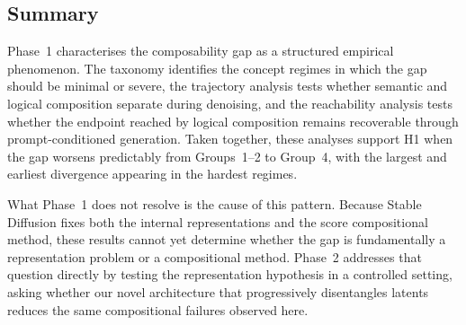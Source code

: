 \subsection{Summary}
\label{subsec:p1_predictions}

Phase~1 characterises the composability gap as a structured empirical phenomenon. The taxonomy
identifies the concept regimes in which the gap should be minimal or severe, the trajectory analysis
tests whether semantic and logical composition separate during denoising, and the reachability
analysis tests whether the endpoint reached by logical composition remains recoverable through
prompt-conditioned generation. Taken together, these analyses support H1 when the gap worsens
predictably from Groups~1--2 to Group~4, with the largest and earliest divergence appearing in the
hardest regimes.

What Phase~1 does not resolve is the cause of this pattern. Because Stable Diffusion \citep{rombach2022high} fixes both the internal
representations and the score compositional method, these results cannot yet determine whether the gap
is fundamentally a representation problem or a compositional method. Phase~2 addresses that question
directly by testing the representation hypothesis in a controlled setting, asking whether our novel architecture that
progressively disentangles latents reduces the same compositional failures observed here.
